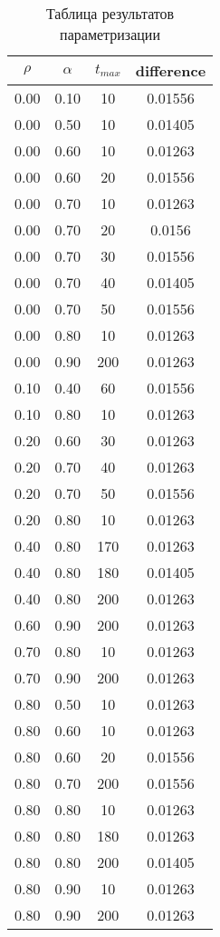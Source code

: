 \documentclass[a4paper, 14pt]{article}
\begin{document}
\begin{table}[H]
        \caption{Таблица результатов параметризации}
            \begin{tabular}{ | c | c | c | c | }
                \hline
                 $\rho$  &  $\alpha$  &  $t_{max}$ & difference\\
                 \hline  
0.00 & 0.10 &  10 & 0.01556 \\
0.00 & 0.50 &  10 & 0.01405 \\
0.00 & 0.60 &  10 & 0.01263 \\
0.00 & 0.60 &  20 & 0.01556 \\
0.00 & 0.70 &  10 & 0.01263 \\
0.00 & 0.70 &  20 & 0.0156 \\
0.00 & 0.70 &  30 & 0.01556 \\
0.00 & 0.70 &  40 & 0.01405 \\
0.00 & 0.70 &  50 & 0.01556 \\
0.00 & 0.80 &  10 & 0.01263 \\
0.00 & 0.90 & 200 & 0.01263 \\
0.10 & 0.40 &  60 & 0.01556 \\
0.10 & 0.80 &  10 & 0.01263 \\
0.20 & 0.60 &  30 & 0.01263 \\
0.20 & 0.70 &  40 & 0.01263 \\
0.20 & 0.70 &  50 & 0.01556 \\
0.20 & 0.80 &  10 & 0.01263 \\
0.40 & 0.80 & 170 & 0.01263 \\
0.40 & 0.80 & 180 & 0.01405 \\
0.40 & 0.80 & 200 & 0.01263 \\
0.60 & 0.90 & 200 & 0.01263 \\
0.70 & 0.80 &  10 & 0.01263 \\
0.70 & 0.90 & 200 & 0.01263 \\
0.80 & 0.50 &  10 & 0.01263 \\
0.80 & 0.60 &  10 & 0.01263 \\
0.80 & 0.60 &  20 & 0.01556 \\
0.80 & 0.70 & 200 & 0.01556 \\
0.80 & 0.80 &  10 & 0.01263 \\
0.80 & 0.80 & 180 & 0.01263 \\
0.80 & 0.80 & 200 & 0.01405 \\
0.80 & 0.90 &  10 & 0.01263 \\
0.80 & 0.90 & 200 & 0.01263 \\

\end{tabular}
\end{table}
\end{document}
